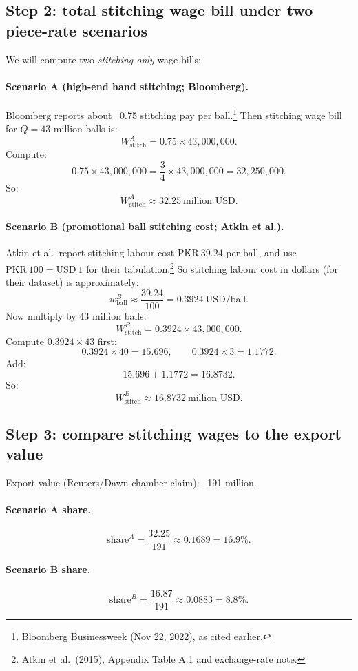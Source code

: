 \documentclass[11pt]{article}
\newcommand{\PKR}{\text{PKR}}
\newcommand{\USD}{\text{USD}}
\newcommand{\uBall}{\text{ball}}
\begin{document}
\subsection{Step 2: total stitching wage bill under two piece-rate scenarios}
We will compute two \emph{stitching-only} wage-bills:

\paragraph{Scenario A (high-end hand stitching; Bloomberg).}
Bloomberg reports about \USD{}~0.75 stitching pay per ball.\footnote{Bloomberg Businessweek (Nov 22, 2022), as cited earlier.}
Then stitching wage bill for \(Q=43\) million balls is:
\[
  W^{A}_{\text{stitch}} = 0.75\times 43{,}000{,}000.
\]
Compute:
\[
  0.75\times 43{,}000{,}000 = \frac{3}{4}\times 43{,}000{,}000 = 32{,}250{,}000.
\]
So:
\[
  W^{A}_{\text{stitch}}\approx 32.25~\text{million USD}.
\]

\paragraph{Scenario B (promotional ball stitching cost; Atkin et al.).}
Atkin et al.\ report stitching labour cost \(\PKR{}~39.24\) per ball, and use \(\PKR{}~100=\USD{}~1\) for their tabulation.\footnote{Atkin et al.\ (2015), Appendix Table A.1 and exchange-rate note.}
So stitching labour cost in dollars (for their dataset) is approximately:
\[
  w^{B}_{\uBall} \approx \frac{39.24}{100} = 0.3924~\USD/\uBall.
\]
Now multiply by \(43\) million balls:
\[
  W^{B}_{\text{stitch}} = 0.3924\times 43{,}000{,}000.
\]
Compute \(0.3924\times 43\) first:
\[
  0.3924\times 40 = 15.696,\qquad 0.3924\times 3 = 1.1772.
\]
Add:
\[
  15.696 + 1.1772 = 16.8732.
\]
So:
\[
  W^{B}_{\text{stitch}} \approx 16.8732~\text{million USD}.
\]

\subsection{Step 3: compare stitching wages to the export value}
Export value (Reuters/Dawn chamber claim): \USD{}~191 million.

\paragraph{Scenario A share.}
\[
  \text{share}^{A}=\frac{32.25}{191}\approx 0.1689 = 16.9\%.
\]

\paragraph{Scenario B share.}
\[
  \text{share}^{B}=\frac{16.87}{191}\approx 0.0883 = 8.8\%.
\]
\end{document}
